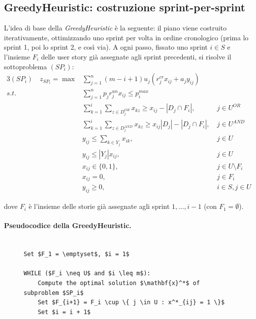 \documentclass[12pt,a4paper,openright,twoside]{book}
\begin{document}
\subsection{GreedyHeuristic: costruzione sprint-per-sprint}

L’idea di base della \emph{GreedyHeuristic} è la seguente: il piano viene costruito iterativamente, ottimizzando uno sprint per volta in ordine cronologico (prima lo sprint 1, poi lo sprint 2, e così via).  
A ogni passo, fissato uno sprint $i \in S$ e l’insieme $F_i$ delle user story già assegnate agli sprint precedenti, si risolve il sottoproblema $(SP_i)$:
\begin{alignat}{3}
(SP_i) \quad z_{SP_i}  = \max  & \sum_{j=1}^{n} (m-i+1)u_j \left( r_j^{cr} x_{ij} + a_j y_{ij} \right) &\ \label{Eq1.SP1}\\
  s.t.\ & \sum_{j=1}^{n} p_j r_j^{un} x_{ij} \leq p_i^{max}                              &\               \label{Eq1.SP2}\\
        & \sum_{k=1}^{i} \sum_{z \in D_j^{OR}} x_{kz} \geq x_{ij}-|D_j \cap F_i|,        &\ j \in U^{OR}  \label{Eq1.SP4}\\
        & \sum_{k=1}^{i} \sum_{z \in D_j^{AND}} x_{kz} \geq x_{ij}|D_j|-|D_j \cap F_i|,  &\ j \in U^{AND} \label{Eq1.SP5}\\
        & y_{ij} \leq \sum_{k \in Y_j} x_{ik},                      &\ j \in U                 \label{Eq1.SP6}\\
        & y_{ij} \leq |Y_j| x_{ij},                                 &\ j \in U                 \label{Eq1.SP7}\\
        & x_{ij} \in \{0,1\},                                       &\ j \in U \setminus F_i   \label{Eq1.SP8a}\\
        & x_{ij} = 0,                                               &\ j \in F_i               \label{Eq1.SP8b}\\
        & y_{ij} \geq 0,                                            &\ i \in S, j \in U        \label{Eq1.SP9}
\end{alignat}

\noindent dove $F_i$ è l’insieme delle storie già assegnate agli sprint $1,\dots,i-1$ (con $F_1=\emptyset$).

\paragraph{Pseudocodice della GreedyHeuristic.}

\begin{figure}[H]
\begin{lstlisting}[style=pseudo,
                   caption={GreedyHeuristic},
                   label={Alg.GH},
                   mathescape=true]

Set $F_1 = \emptyset$, $i = 1$

WHILE ($F_i \neq U$ and $i \leq m$):
    Compute the optimal solution $\mathbf{x}^*$ of subproblem $SP_i$
    Set $F_{i+1} = F_i \cup \{ j \in U : x^*_{ij} = 1 \}$
    Set $i = i + 1$

\end{lstlisting}
\end{figure}
\end{document}
